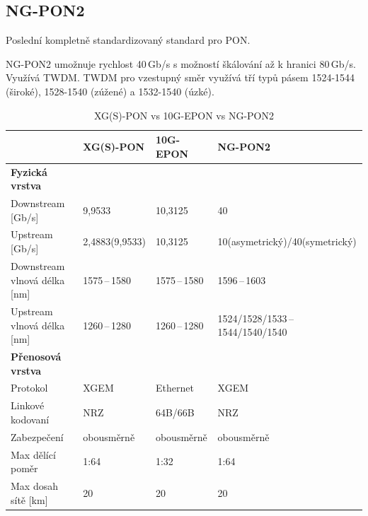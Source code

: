 \subsection{NG-PON2}
Poslední kompletně standardizovaný standard pro PON.

NG-PON2 umožnuje rychlost 40\,Gb/s s možností škálování až k hranici 80\,Gb/s. Využívá TWDM. TWDM pro vzestupný směr využívá tří typů pásem 1524-1544 (široké), 1528-1540 (zúžené) a 1532-1540 (úzké).

\begin{table}[ht]
    \centering
    \caption{XG(S)-PON vs 10G-EPON vs NG-PON2}
    \begin{tabular}{|l|l|l|l|}
        \hline
                                     & XG(S)-PON      & 10G-EPON       & NG-PON2                            \\\hline\hline
        \textbf{Fyzická vrstva}      &                &                &                                    \\\hline\hline
        Downstream [Gb/s]            & 9,9533         & 10,3125        & 40                                 \\\hline
        Upstream [Gb/s]              & 2,4883(9,9533) & 10,3125        & 10(asymetrický)/40(symetrický)     \\\hline
        Downstream vlnová délka [nm] & 1575\,--\,1580 & 1575\,--\,1580 & 1596\,--\,1603                     \\\hline
        Upstream vlnová délka [nm]   & 1260\,--\,1280 & 1260\,--\,1280 & 1524/1528/1533\,--\,1544/1540/1540 \\\hline\hline
        \textbf{Přenosová vrstva}    &                &                &                                    \\\hline\hline
        Protokol                     & XGEM           & Ethernet       & XGEM                               \\\hline
        Linkové kodovaní             & NRZ            & 64B/66B        & NRZ                                \\\hline
        Zabezpečení                  & obousměrně     & obousměrně     & obousměrně                         \\\hline
        Max dělící poměr             & 1:64           & 1:32           & 1:64                               \\\hline
        Max dosah sítě [km]          & 20             & 20             & 20                                 \\\hline
    \end{tabular}
\end{table}

